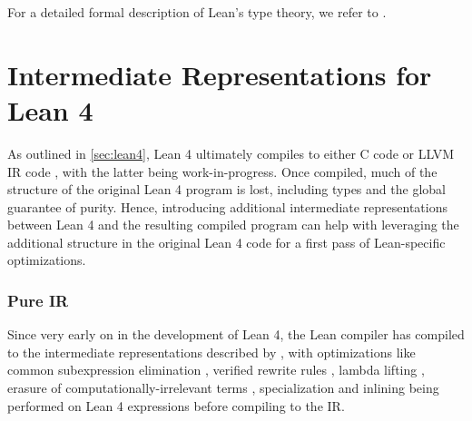 For a detailed formal description of Lean's type theory, we refer to \cite{carneiro_type_2019}.

\section{Intermediate Representations for Lean 4}\label{sec:irs}
As outlined in \cref{sec:lean4}, Lean 4 ultimately compiles to either C code or LLVM IR code \citep{lattner_llvm_2004}, with the latter being work-in-progress. Once compiled, much of the structure of the original Lean 4 program is lost, including types and the global guarantee of purity. Hence, introducing additional intermediate representations between Lean 4 and the resulting compiled program can help with leveraging the additional structure in the original Lean 4 code for a first pass of Lean-specific optimizations.

\subsubsection{Pure IR}
Since very early on in the development of Lean 4, the Lean compiler has compiled to the intermediate representations described by \cite{ullrich_counting_2020}, with optimizations like common subexpression elimination \citep{cocke_global_1970}, verified rewrite rules \citep{jones_playing_2001}, lambda lifting \citep{johnsson_lambda_1985}, erasure of computationally-irrelevant terms \citep{tejiscak_erasure_2019}, specialization \citep{augustsson_implementing_1993} and inlining \citep{jones_secrets_2002} being performed on Lean 4 expressions before compiling to the IR.

